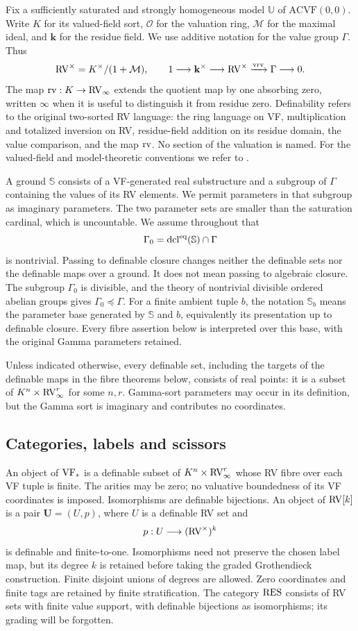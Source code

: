 Fix a sufficiently saturated and strongly homogeneous model $\mathbb U$
of $\mathrm{ACVF}(0,0)$. Write $K$ for its valued-field sort,
$\mathcal O$ for the valuation ring, $\mathcal M$ for the maximal ideal,
and $\mathbf k$ for the residue field. We use additive notation for the
value group $\Gamma$. Thus
\[
 \mathrm{RV}^\times=K^\times/(1+\mathcal M),\qquad
 1\longrightarrow\mathbf k^\times\longrightarrow\mathrm{RV}^\times
   \xrightarrow{\operatorname{vrv}}\Gamma\longrightarrow0.
\]
The map $\operatorname{rv}:K\to\mathrm{RV}_\infty$ extends the quotient map by one absorbing
zero, written $\infty$ when it is useful to distinguish it from residue
zero. Definability refers to the original two-sorted RV language: the
ring language on VF, multiplication and totalized inversion on RV,
residue-field addition on its residue domain, the value comparison,
and the map $\operatorname{rv}$. No section of the valuation is named.
For the valued-field and model-theoretic conventions we refer to
\cite{EnglerPrestel,Marker}.

A ground $\mathbb S$ consists of a VF-generated real substructure and
a subgroup of $\Gamma$ containing the values of its RV elements.
We permit parameters in that subgroup as imaginary parameters. The
two parameter sets are smaller than the saturation cardinal, which is
uncountable. We assume throughout that
\[
 \Gamma_0=\operatorname{dcl}^{\mathrm{eq}}(\mathbb S)\cap\Gamma
\]
is nontrivial. Passing to definable closure changes neither the definable
sets nor the definable maps over a ground. It does not mean passing to
algebraic closure. The subgroup $\Gamma_0$ is divisible, and the theory
of nontrivial divisible ordered abelian groups gives
$\Gamma_0\preceq\Gamma$.
For a finite ambient tuple $b$, the notation $\mathbb S_b$ means the
parameter base generated by $\mathbb S$ and $b$, equivalently its
presentation up to definable closure. Every fibre assertion below is
interpreted over this base, with the original Gamma parameters retained.

Unless indicated otherwise, every definable set, including the targets of
the definable maps in the fibre theorems below, consists of real points:
it is a subset of $K^n\times\mathrm{RV}_\infty^r$ for some $n,r$. Gamma-sort
parameters may occur in its definition, but the Gamma sort is imaginary
and contributes no coordinates.

\subsection{Categories, labels and scissors}
An object of $\mathrm{VF}_*$ is a definable subset of
$K^n\times\mathrm{RV}_\infty^r$ whose RV fibre over each VF tuple is finite.
The arities may be zero; no valuative boundedness of its VF coordinates
is imposed. Isomorphisms are definable bijections. An object of
$\mathrm{RV}[k]$ is a pair $\bm U=(U,p)$, where $U$ is a definable RV set and
\[
 p:U\longrightarrow(\mathrm{RV}^\times)^k
\]
is definable and finite-to-one. Isomorphisms need not preserve the
chosen label map, but its degree $k$ is retained before taking the
graded Grothendieck construction. Finite disjoint unions of degrees
are allowed. Zero coordinates and finite tags are retained by finite
stratification. The category $\mathrm{RES}$ consists of RV sets with finite
value support, with definable bijections as isomorphisms; its grading
will be forgotten.

